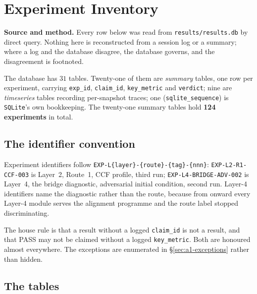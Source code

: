 \chapter{Experiment Inventory}
\label{ch:experiments}

\begin{record}
\textbf{Source and method.} Every row below was read from
\texttt{results/results.db} by direct query. Nothing here is reconstructed
from a session log or a summary; where a log and the database disagree, the
database governs, and the disagreement is footnoted.

\smallskip
The database has \(31\) tables. Twenty-one of them are \emph{summary} tables,
one row per experiment, carrying \texttt{exp\_id}, \texttt{claim\_id},
\texttt{key\_metric} and \texttt{verdict}; nine are \emph{timeseries} tables
recording per-snapshot traces; one (\texttt{sqlite\_sequence}) is
\texttt{SQLite}'s own bookkeeping. The twenty-one summary tables hold
\textbf{124 experiments} in total.
\end{record}

\section{The identifier convention}
\label{sec:a1-ids}

Experiment identifiers follow \texttt{EXP-L\{layer\}-\{route\}-\{tag\}-\{nnn\}}:
\texttt{EXP-\allowbreak{}L2-\allowbreak{}R1-\allowbreak{}CCF-\allowbreak{}003} is Layer~2, Route~1, CCF profile, third run;
\texttt{EXP-\allowbreak{}L4-\allowbreak{}BRIDGE-\allowbreak{}ADV-\allowbreak{}002} is Layer~4, the bridge diagnostic, adversarial
initial condition, second run. Layer-4 identifiers name the diagnostic rather
than the route, because from  onward every Layer-4 module serves the
alignment programme and the route label stopped discriminating.

The house rule is that a result without a logged \texttt{claim\_id} is not a
result, and that \textsf{PASS} may not be claimed without a logged
\texttt{key\_metric}. Both are honoured almost everywhere. The exceptions are
enumerated in \S\ref{sec:a1-exceptions} rather than hidden.

\section{The tables}
\label{sec:a1-tables}


